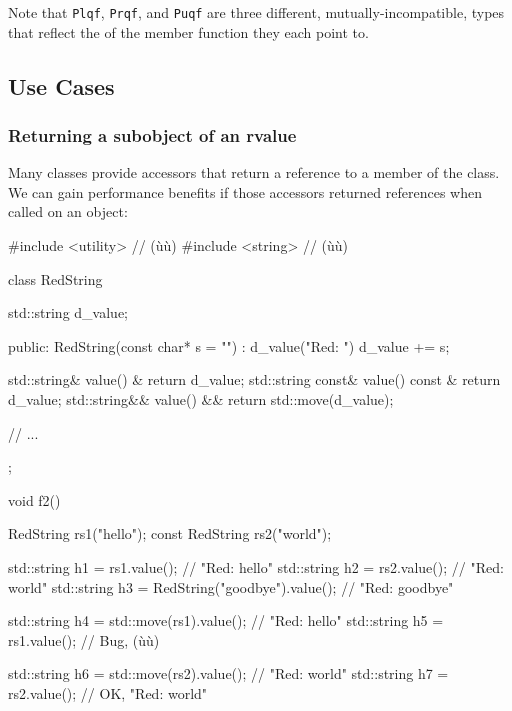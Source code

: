 \noindent Note that \lstinline!Plqf!, \lstinline!Prqf!, and \lstinline!Puqf! are three
different, mutually-incompatible, types that reflect the
 of the member function they each point to.

\subsection[Use Cases]{Use Cases}\label{use-cases-refqualifier}

\subsubsection[Returning a subobject of an \romeovalue{rvalue}]{Returning a subobject of an {\sfbsubsubsecitalRomeo rvalue}}\label{returning-a-subobject-of-an-rvalue}

Many classes provide accessors that return a reference to a member of
the class. We can gain performance benefits if those accessors returned
 references when called on an  object:

\begin{emcppslisting}[emcppsbatch=e3]
#include <utility>  // (ù{}ù)
#include <string>   // (ù{}ù)

class RedString
{
   std::string d_value;

public:
    RedString(const char* s = "") : d_value("Red: ") { d_value += s; }

    std::string&        value() &       { return d_value; }
    std::string const&  value() const & { return d_value; }
    std::string&&       value() &&      { return std::move(d_value); }

    // ...
};

void f2()
{
    RedString       rs1("hello");
    const RedString rs2("world");

    std::string h1 = rs1.value();                   // "Red: hello"
    std::string h2 = rs2.value();                   // "Red: world"
    std::string h3 = RedString("goodbye").value();  // "Red: goodbye"

    std::string h4 = std::move(rs1).value();        // "Red: hello"
    std::string h5 = rs1.value();                   // Bug, (ù{}ù)

    std::string h6 = std::move(rs2).value();        // "Red: world"
    std::string h7 = rs2.value();                   // OK, "Red: world"
}
\end{emcppslisting}
    

